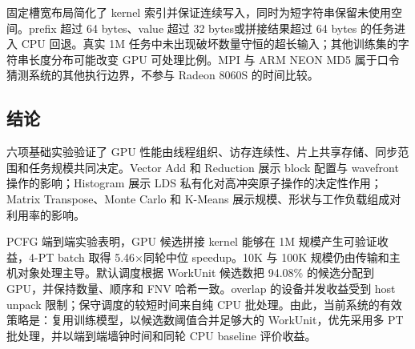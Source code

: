 \documentclass[UTF8,11pt,a4paper]{ctexart}
\begin{document}
固定槽宽布局简化了 kernel 索引并保证连续写入，同时为短字符串保留未使用空间。prefix 超过 64 bytes、value 超过 32 bytes或拼接结果超过 64 bytes 的任务进入 CPU 回退。真实 1M 任务中未出现破坏数量守恒的超长输入；其他训练集的字符串长度分布可能改变 GPU 可处理比例。MPI 与 ARM NEON MD5 属于口令猜测系统的其他执行边界，不参与 Radeon 8060S 的时间比较。

\subsection{结论}

六项基础实验验证了 GPU 性能由线程组织、访存连续性、片上共享存储、同步范围和任务规模共同决定。Vector Add 和 Reduction 展示 block 配置与 wavefront 操作的影响；Histogram 展示 LDS 私有化对高冲突原子操作的决定性作用；Matrix Transpose、Monte Carlo 和 K-Means 展示规模、形状与工作负载组成对利用率的影响。

PCFG 端到端实验表明，GPU 候选拼接 kernel 能够在 1M 规模产生可验证收益，4-PT batch 取得 5.46×同轮中位 speedup。10K 与 100K 规模仍由传输和主机对象处理主导。默认调度根据 WorkUnit 候选数把 94.08\% 的候选分配到 GPU，并保持数量、顺序和 FNV 哈希一致。overlap 的设备并发收益受到 host unpack 限制；保守调度的较短时间来自纯 CPU 批处理。由此，当前系统的有效策略是：复用训练模型，以候选数阈值合并足够大的 WorkUnit，优先采用多 PT 批处理，并以端到端墙钟时间和同轮 CPU baseline 评价收益。
\end{document}
